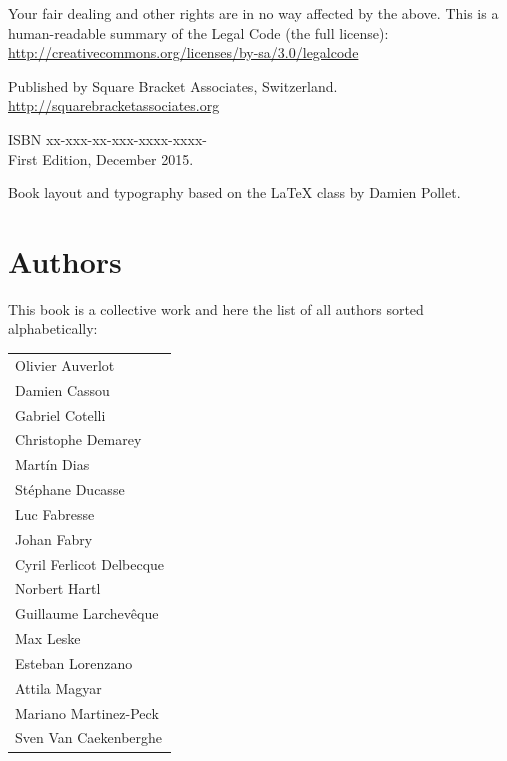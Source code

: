 \documentclass[10pt,twoside,english,showtrims]{support/latex/sbabook}
\begin{document}
{  Your fair dealing and other rights are in no way affected by the
  above. This is a human-readable summary of the Legal Code (the full
  license): \\
  \url{http://creativecommons.org/licenses/by-sa/3.0/legalcode}

  \vfill

  Published by Square Bracket Associates, Switzerland. \\
  \url{http://squarebracketassociates.org} \\ \smallskip

  ISBN xx-xxx-xx-xxx-xxxx-xxxx- \\
  First Edition, December 2015. \\ \smallskip

  Book layout and typography based on the  \LaTeX{} class by Damien Pollet.
}


\frontmatter
\chapter*{Authors}

This book is a collective work and here the list of all authors sorted alphabetically:

\begin{tabular}{l}
Olivier Auverlot\\
Damien Cassou\\
Gabriel Cotelli\\
Christophe Demarey\\
Martín Dias\\
Stéphane Ducasse\\
Luc Fabresse\\
Johan Fabry\\
Cyril Ferlicot Delbecque\\
Norbert Hartl\\
Guillaume Larchevêque\\
Max Leske\\
Esteban Lorenzano\\
Attila Magyar\\
Mariano Martinez-Peck\\
Sven Van Caekenberghe\\
\end{tabular}

\tableofcontents

\mainmatter

% 
% 
\end{document}
